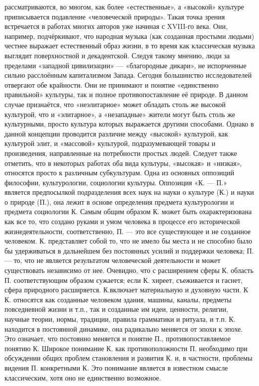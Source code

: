 \documentclass[12pt]{article}
\begin{document}
рассматриваются,  во  многом,  как  более  «естественные»,  а  «высокой»  культуре  приписывается  подавление
«человеческой природы». Такая точка зрения встречается в работах многих авторов уже начиная с XVIII-го
века. Они, например, подчёркивают, что народная музыка (как созданная простыми людьми) честнее выражает
естественный образ  жизни,  в то  время как  классическая  музыка выглядит  поверхностной и  декадентской.
Следуя такому мнению, люди за пределами «западной цивилизации» — «благородные дикари», не испорченные
сильно расслоённым капитализмом Запада.
Сегодня большинство исследователей отвергают обе крайности. Они не принимают и понятие «единственно
правильной»  культуры,  так  и  полное  противопоставление  её  природе.  В  данном  случае  признаётся,  что
«неэлитарное» может обладать столь же высокой культурой, что и «элитарное», а «незападные» жители могут
быть  столь  же  культурными,  просто  культура  которых  выражается  другими  способами.  Однако  в  данной
концепции проводится различие между «высокой» культурой, как культурой элит, и «массовой» культурой,
подразумевающей  товары  и  произведения,  направленные  на  потребности  простых  людей.  Следует  также
отметить, что в некоторых работах оба вида культуры, «высокая» и «низкая», относятся просто к различным
субкультурам.
Одна из основных оппозиций философии, культурологии, социологии культуры. Оппозиция «К. — П.» является
предпосылкой подразделения всех наук на науки о культуре (К.) и науки о природе (П.), она лежит в основе
определения  предмета  культурологии  и  предмета  социологии  К.  Самым  общим  образом  К.  может  быть
охарактеризована  как  все  то,  что  создано  руками  и  умом  человека  в  процессе  его  исторической
жизнедеятельности, соответственно, П. — это все существующее и не созданное человеком. К. представляет
собой то, что не имело бы места и не способно было бы удерживаться в дальнейшем без постоянных усилий и
поддержки человека; П. — то, что не является результатом человеческой деятельности и может существовать
независимо от нее. Очевидно, что с расширением сферы К. область П. соответствующим образом сужается;
если К. хиреет, съеживается и гаснет, сфера природного расширяется.
К.включает материальную и духовную части. К К. относятся как созданные человеком здания, машины, каналы,
предметы повседневной жизни и т.п., так и созданные им идеи, ценности, религии, научные теории, нормы,
традиции, правила грамматики и ритуала, и т.п. К. находится в постоянной динамике, она радикально меняется
от эпохи к эпохе. Это означает, что постоянно меняется и понятие П., противопоставляемое понятию К. 
Широкое понимание К. как противоположности П. необходимо при обсуждении общих проблем становления и
развития К. и, в частности, проблемы видения П. конкретными К. Это понимание является в известном смысле
классическим, хотя оно не единственно возможное.
\end{document}
